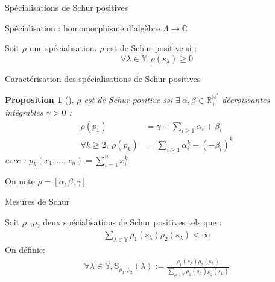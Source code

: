\documentclass[french]{beamer}
\newtheorem{proposition}[theorem]{Proposition}
\begin{document}
\begin{frame}{Spécialisations de Schur positives}
\begin{definition}[Spécialisation]
Spécialisation : homomorphisme d'algèbre $\Lambda \to \mathbb{C}$  \end{definition}
\begin{definition}
Soit $\rho$ une spécialisation. $\rho$ est de Schur positive si : 
$$ \forall \lambda \in \mathbb{Y},\rho(s_\lambda)\geq 0 $$
\end{definition}
\end{frame}
\begin{frame}{Caractérisation des spécialisations de Schur positives}
\begin{proposition}[\cite{OK}]
$\rho$ est de Schur positive ssi $\exists \  \alpha,\beta \in \mathbb{R}_+^{\mathbb{N}^*}$ décroissantes intégrables $\gamma>0$ :
\begin{align*}
\rho(p_1)&=\gamma  + \sum_{i\geq 1} \alpha_i+\beta_i \\
\forall k\geq 2 ,\  \rho(p_k)&=\sum_{i\geq 1} \alpha_i^k-(-\beta_i)^{k}
\end{align*}
avec :
$p_k(x_1,\dots,x_n)=\sum_{i=1}^n x_i^k
$\end{proposition}
On note $\rho=[\alpha,\beta,\gamma]$
\end{frame} 
\begin{frame}{Mesures de Schur}
\begin{definition}
Soit $\rho_1$,$\rho_2$  deux spécialisations de Schur positives tels que : 
\begin{align*}
\sum_{\lambda \in \mathbb{Y}} \rho_1(s_\lambda
)\rho_2(s_\lambda) <\infty \end{align*}
On définie:
\begin{align*}
\forall \lambda \in \mathbb{Y}, \mathbb{S}_{\rho_1,\rho_2}({\lambda}):=\frac{ \rho_1(s_\lambda
)\rho_2(s_\lambda)}{\sum_{\mu \in \mathbb{Y}} \rho_1(s_\mu
)\rho_2(s_\mu)}
\end{align*}
\end{definition}
\end{frame}  
\end{document}
